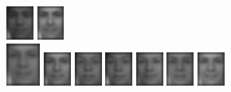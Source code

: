 \begin{figure}[hbt]
  \includegraphics[width=0.08\textwidth]{../results/L_rez/incorrect80/1/9.jpg}
  \includegraphics[width=0.08\textwidth]{../results/L_rez/incorrect80/1/10.jpg} \\
  \vspace{4pt}
  \includegraphics[width=0.1\textwidth]{../results/L_rez/incorrect80/2/testImg.jpg} \vline
  \hspace{2pt}
  \includegraphics[width=0.08\textwidth]{../results/L_rez/incorrect80/2/1.jpg}
  \includegraphics[width=0.08\textwidth]{../results/L_rez/incorrect80/2/2.jpg}
  \includegraphics[width=0.08\textwidth]{../results/L_rez/incorrect80/2/3.jpg}
  \includegraphics[width=0.08\textwidth]{../results/L_rez/incorrect80/2/4.jpg}
  \includegraphics[width=0.08\textwidth]{../results/L_rez/incorrect80/2/5.jpg}
  \includegraphics[width=0.08\textwidth]{../results/L_rez/incorrect80/2/6.jpg}

\end{figure}
